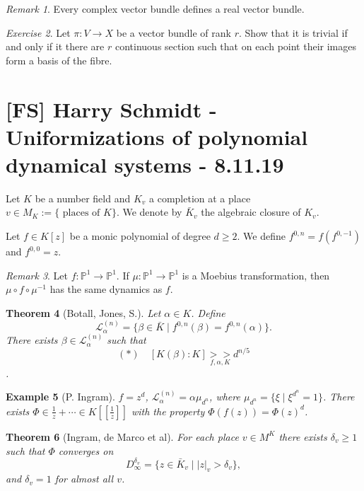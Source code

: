 \documentclass[12pt]{article}
\theoremstyle{darkgreentheorem}
\newtheorem{thm}{Theorem}
\theoremstyle{darkbluedefinition}
\theoremstyle{darkredexample}
\newtheorem{exa}[thm]{Example}
\theoremstyle{remark}
\newtheorem{rem}[thm]{Remark}
\newtheorem{exe}[thm]{Exercise}
\newcommand{\1}{\mathbbm{1}}
\renewcommand{\P}{\mathbb{P}}
\renewcommand{\L}{\mathcal{L}}
\begin{document}
\begin{rem}
    Every complex vector bundle defines a real vector bundle.
\end{rem}

\begin{exe}
    Let $\pi\colon V\to X$ be a vector bundle of rank $r$.
    Show that it is trivial if and only if it there are $r$ continuous section such that on each point their images form a basis of the fibre.
\end{exe}

\section{[FS] Harry Schmidt - Uniformizations of polynomial dynamical systems - 8.11.19}

Let $K$ be a number field and $K_{v}$ a completion at a place $v\in M_{K}:=\{ \text{ places of }K\}$.
We denote by $\bar{K}_{v}$ the algebraic closure of $K_{v}$.

Let $f\in K[z]$ be a monic polynomial of degree $d\geqslant 2$.
We define $f^{0,n}=f(f^{0,-1})$ and $f^{0,0}=z$.

\begin{rem}
    Let $f\colon \P^{1}\to \P^{1}$.
    If $\mu\colon \P^{1}\to \P^{1}$ is a Moebius transformation, then $\mu\circ f\circ \mu^{-1}$ has the same dynamics as $f$.
\end{rem}

\begin{thm}[Botall, Jones, S.]
    Let $\alpha\in K$.
    Define
    \[ \L_{\alpha}^{(n)}=\{ \beta\in \bar{K}\mid f^{0,n}(\beta)=f^{0,n}(\alpha)\}. \]
    There exists $\beta\in \L_{\alpha}^{(n)}$ such that
    \[ (*)\quad [K(\beta):K]\underset{f,\alpha,K}{>>}d^{n/5}\].
\end{thm}

\begin{exa}[P. Ingram]
    $f=z^{d}$, $\L_{\alpha}^{(n)}=\alpha\mu_{d^{n}}$, where $\mu_{d^{n}}=\{ \xi \mid \xi^{d^{n}}=1\}$.
    There exists $\Phi\in \frac{1}{z}+\cdots \in K[[\frac{1}{z}]]$ with the property $\Phi(f(z))=\Phi(z)^{d}$.
\end{exa}

\begin{thm}[Ingram, de Marco et al]
    For each place $v\in M^{K}$ there exists $\delta_{v}\geqslant 1$ such that $\Phi$ converges on
    \[ D_{\infty}^{\delta_{v}}=\{ z\in \bar{K}_{v}\mid |z|_{v}>\delta_{v}\},\]
    and $\delta_{v}=1$ for almost all $v$.
\end{thm}
\end{document}
